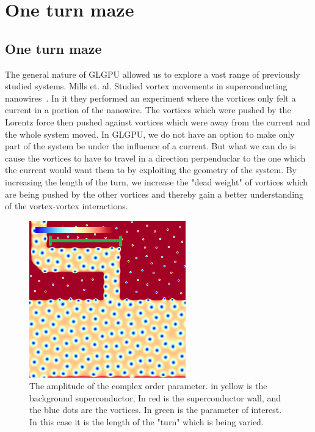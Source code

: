 \chapter{One turn maze}

\section{One turn maze}
The general nature of GLGPU allowed us to explore a vast range of previously studied systems. Mills et. al. Studied vortex movements in superconducting nanowires~\cite{Mills16}. In it they performed an experiment where the vortices only felt a current in a portion of the nanowire. The vortices which were pushed by the Lorentz force then pushed against vortices which were away from the current and the whole system moved. In GLGPU, we do not have an option to make only part of the system be under the influence of a current. But what we can do is cause the vortices to have to travel in a direction perpenduclar to the one which the current would want them to by exploiting the geometry of the system. By increasing the length of the turn, we increase the "dead weight" of vortices which are being pushed by the other vortices and thereby gain a better understanding of the vortex-vortex interactions.   

\begin{figure}[htbp]
\begin{center}
\includegraphics[scale=.50]{oneKinkDone.png}
\caption{ The amplitude of the complex order parameter. in yellow is the background superconductor, In red is the superconductor wall, and the blue dots are the vortices. In green is the parameter of interest. In this case it is the length of the "turn" which is being varied.}
\label{kinkPic}
\end{center}
\end{figure}


